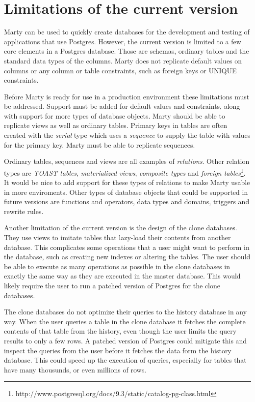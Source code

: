 \section{Limitations of the current version}
Marty can be used to quickly create databases for the development and testing of applications that use Postgres.
However, the current version is limited to a few core elements in a Postgres database.
Those are schemas, ordinary tables and the standard data types of the columns.
Marty does not replicate default values on columns or any column or table constraints, such as foreign keys or UNIQUE constraints.

Before Marty is ready for use in a production environment these limitations must be addressed.
Support must be added for default values and constraints, along with support for more types of database objects.
Marty should be able to replicate views as well as ordinary tables.
Primary keys in tables are often created with the \textit{serial} type which uses a \textit{sequence} to supply the table with values for the primary key.
Marty must be able to replicate sequences.

Ordinary tables, sequences and views are all examples of \textit{relations}.
Other relation types are \textit{TOAST tables}, \textit{materialized views}, \textit{composite types} and \textit{foreign tables}\footnote{http://www.postgresql.org/docs/9.3/static/catalog-pg-class.html}.
It would be nice to add support for these types of relations to make Marty usable in more enviroments.
Other types of database objects that could be supported in future versions are functions and operators, data types and domains, triggers and rewrite rules.

Another limitation of the current version is the design of the clone databases.
They use views to imitate tables that lazy-load their contents from another database.
This complicates some operations that a user might want to perform in the database, such as creating new indexes or altering the tables.
The user should be able to execute as many operations as possible in the clone databases in exactly the same way as they are executed in the master database.
This would likely require the user to run a patched version of Postgres for the clone databases.

The clone databases do not optimize their queries to the history database in any way.
When the user queries a table in the clone database it fetches the complete contents of that table from the history, even though the user limits the query results to only a few rows.
A patched version of Postgres could mitigate this and inspect the queries from the user before it fetches the data form the history database.
This could speed up the execution of queries, especially for tables that have many thousunds, or even millions of rows.

